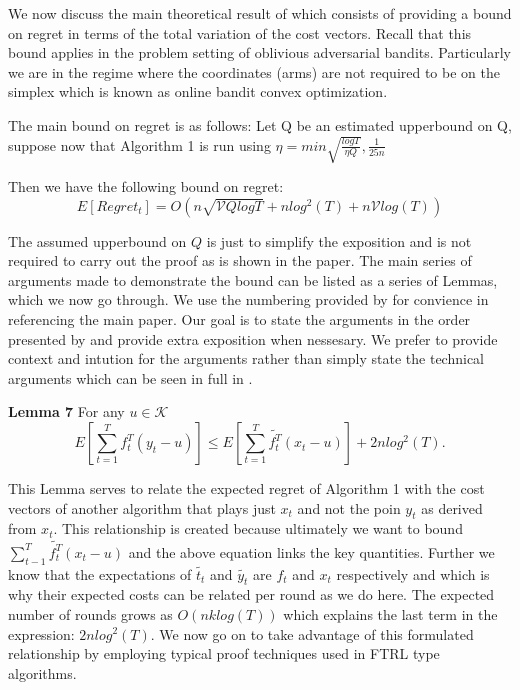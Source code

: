 We now discuss the main theoretical result of \citep{hazan} which consists of providing a bound on regret in terms of the total variation of the cost vectors. Recall that this bound applies
in the problem setting of oblivious adversarial bandits. Particularly we are in the regime where the coordinates (arms) are not  required to be on the simplex which is known as  online bandit convex optimization.

The main bound on regret is as follows: Let Q be an estimated upperbound on Q, suppose now that Algorithm 1 is run using $\eta = min{\sqrt{\frac{log T}{\eta Q}}, \frac{1}{25n}}$

Then we have the following bound on regret:
\begin{equation}
  E[Regret_t] = O(n \sqrt{\mathcal{V}Q log T} + n log^2(T) + n \mathcal{V}log(T))
\end{equation}

The assumed upperbound on $Q$ is just to simplify the exposition and is not required to carry out the proof as is shown in the paper. The main series of arguments made to demonstrate the bound can be listed as a series of Lemmas, which we now go through. We use the numbering provided by \citep{hazan} for convience in referencing the main paper. Our goal is to state the arguments in the 
order presented by \citep{hazan} and provide extra exposition when nessesary. We prefer to provide context and intution for the arguments rather than simply state the technical arguments which
can be seen in full in \citep{hazan}.

\textbf{Lemma 7}
For any $u \in \mathcal{K}$
\begin{equation}
  E[\sum_{t=1}^T f_{t}^T(y_t - u)] \leq E[\sum_{t=1}^T \tilde{f_{t}^T}(x_t - u)] + 2nlog^2(T).
\end{equation}

This Lemma serves to relate the expected regret of Algorithm 1 with the cost vectors of another algorithm that plays just $x_t$ and not the poin $y_t$ as derived from $x_t$. This relationship is created because ultimately we want to bound $\sum_{t-1}^T \tilde{f_t^T}(x_t - u)$ and the above equation links the key quantities. Further we know that the expectations of $\tilde{t_t}$ and $\tilde{y_t}$ are $f_t$ and $x_t$ respectively and which is why their expected costs can be related per round as we do here. The expected number of rounds grows as $O(nklog(T))$ which explains the last term in the expression: $2nlog^2(T)$. We now go on to take advantage of this formulated relationship by employing typical proof techniques used in FTRL type algorithms.


